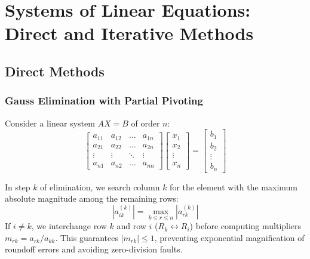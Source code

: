 \documentclass[11pt,a4paper]{article}
\begin{document}
\newpage

\section{Systems of Linear Equations: Direct and Iterative Methods}

\subsection{Direct Methods}

\subsubsection{Gauss Elimination with Partial Pivoting}
Consider a linear system $AX = B$ of order $n$:
\begin{equation}
    \begin{bmatrix}
        a_{11} & a_{12} & \dots & a_{1n} \\
        a_{21} & a_{22} & \dots & a_{2n} \\
        \vdots & \vdots & \ddots & \vdots \\
        a_{n1} & a_{n2} & \dots & a_{nn}
    \end{bmatrix}
    \begin{bmatrix} x_1 \\ x_2 \\ \vdots \\ x_n \end{bmatrix}
    =
    \begin{bmatrix} b_1 \\ b_2 \\ \vdots \\ b_n \end{bmatrix}
\end{equation}

\begin{defbox}
In step $k$ of elimination, we search column $k$ for the element with the maximum absolute magnitude among the remaining rows:
$$|a_{ik}^{(k)}| = \max_{k \le r \le n} |a_{rk}^{(k)}|$$
If $i \ne k$, we interchange row $k$ and row $i$ ($R_k \leftrightarrow R_i$) before computing multipliers $m_{rk} = a_{rk}/a_{kk}$. This guarantees $|m_{rk}| \le 1$, preventing exponential magnification of roundoff errors and avoiding zero-division faults.
\end{defbox}
\end{document}
